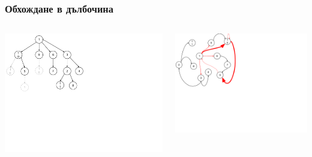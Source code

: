 \documentclass{beamer}
\begin{document}
\begin{frame}[fragile]
\frametitle{Обхождане в дълбочина}
 

\begin{columns}[t]
  \begin{column}{0.55\textwidth}
    \includegraphics[width=12cm]{images/graph_span}
  \end{column}
  \begin{column}{0.45\textwidth}
  \includegraphics[width=10cm]{images/graph_dfs}
  \end{column}
\end{columns}

 


\end{frame}
\end{document}
